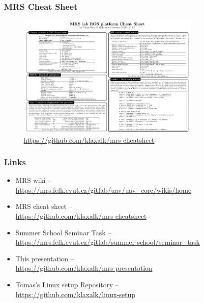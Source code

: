\documentclass[aspectratio=1610]{beamer}
\begin{document}
\begin{frame}
  \frametitle{MRS Cheat Sheet}
  \vspace{-1em}
  \begin{figure}
    \caption*{\url{https://github.com/klaxalk/mrs-cheatsheet}}
    \includegraphics[width=0.8\textwidth]{./fig/mrs_cheatsheet.png}
  \end{figure}

\end{frame}

\begin{frame}
  \frametitle{Links}

  \begin{itemize}
    \item MRS wiki -- \\\url{https://mrs.felk.cvut.cz/gitlab/uav/uav_core/wikis/home}
    \item MRS cheat sheet -- \\\url{https://github.com/klaxalk/mrs-cheatsheet}
    \item Summer School Seminar Task -- \\\url{https://mrs.felk.cvut.cz/gitlab/summer-school/seminar_task}
    \item This presentation -- \\\url{https://github.com/klaxalk/mrs-presentation}
    \item Tomas's Linux setup Repository -- \\\url{https://github.com/klaxalk/linux-setup}

  \end{itemize}

\end{frame}

\end{document}
